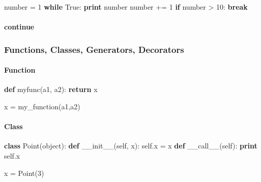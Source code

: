 \documentclass[]{article}
\newenvironment{Shaded}{}{}
\newcommand{\KeywordTok}[1]{\textcolor[rgb]{0.00,0.44,0.13}{\textbf{{#1}}}}
\newcommand{\DataTypeTok}[1]{\textcolor[rgb]{0.56,0.13,0.00}{{#1}}}
\newcommand{\DecValTok}[1]{\textcolor[rgb]{0.25,0.63,0.44}{{#1}}}
\newcommand{\OtherTok}[1]{\textcolor[rgb]{0.00,0.44,0.13}{{#1}}}
\newcommand{\NormalTok}[1]{{#1}}
\begin{document}
\begin{Shaded}
\begin{Highlighting}[]
\NormalTok{number = }\DecValTok{1}
\KeywordTok{while} \OtherTok{True}\NormalTok{:}
    \KeywordTok{print} \NormalTok{number}
    \NormalTok{number += }\DecValTok{1}
    \KeywordTok{if} \NormalTok{number > }\DecValTok{10}\NormalTok{:}
        \KeywordTok{break}
\end{Highlighting}
\end{Shaded}

\paragraph{continue}

\begin{Shaded}
\end{Shaded}

\subsubsection{Functions, Classes, Generators, Decorators}

\paragraph{Function}

\begin{Shaded}
\begin{Highlighting}[]
\KeywordTok{def} \NormalTok{myfunc(a1, a2):}
    \KeywordTok{return} \NormalTok{x}

\NormalTok{x = my_function(a1,a2)}
\end{Highlighting}
\end{Shaded}

\paragraph{Class}

\begin{Shaded}
\begin{Highlighting}[]
\KeywordTok{class} \NormalTok{Point(}\DataTypeTok{object}\NormalTok{):}
    \KeywordTok{def} \OtherTok{__init__}\NormalTok{(}\OtherTok{self}\NormalTok{, x):}
        \OtherTok{self}\NormalTok{.x = x}
    \KeywordTok{def} \OtherTok{__call__}\NormalTok{(}\OtherTok{self}\NormalTok{):}
        \KeywordTok{print} \OtherTok{self}\NormalTok{.x}

\NormalTok{x = Point(}\DecValTok{3}\NormalTok{)}
\end{Highlighting}
\end{Shaded}
\end{document}
